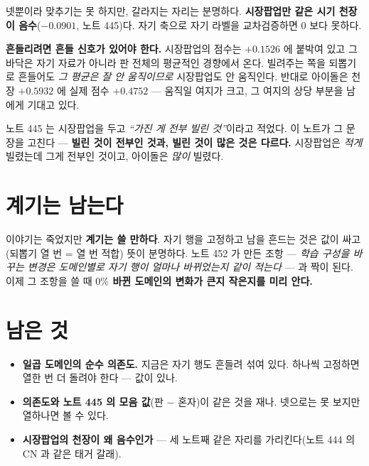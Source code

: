 \documentclass[11pt]{article}
\begin{document}
넷뿐이라 맞추기는 못 하지만, 갈라지는 자리는 분명하다. \textbf{시장팝업만
같은 시기 천장이 음수}($-0.0901$, 노트 445)다. 자기 축으로 자기 라벨을
교차검증하면 $0$ 보다 못하다.

\textbf{흔들리려면 흔들 신호가 있어야 한다.} 시장팝업의 점수는
$+0.1526$ 에 붙박여 있고 그 바닥은 자기 자료가 아니라 판 전체의 평균적인
경향에서 온다. 빌려주는 쪽을 되뽑기로 흔들어도 \emph{그 평균은 잘 안
움직이므로} 시장팝업도 안 움직인다. 반대로 아이돌은 천장 $+0.5932$ 에
실제 점수 $+0.4752$ --- 움직일 여지가 크고, 그 여지의 상당 부분을 남에게
기대고 있다.

노트 445 는 시장팝업을 두고 \emph{``가진 게 전부 빌린 것''}이라고 적었다.
이 노트가 그 문장을 고친다 --- \textbf{빌린 것이 전부인 것과, 빌린 것이
많은 것은 다르다.} 시장팝업은 \emph{적게} 빌렸는데 그게 전부인 것이고,
아이돌은 \emph{많이} 빌렸다.

\section{계기는 남는다}

이야기는 죽었지만 \textbf{계기는 쓸 만하다}. 자기 행을 고정하고 남을
흔드는 것은 값이 싸고(되뽑기 열 번 = 열 번 적합) 뜻이 분명하다. 노트 452
가 만든 조항 --- \emph{학습 구성을 바꾸는 변경은 도메인별로 자기 행이
얼마나 바뀌었는지 같이 적는다} --- 과 짝이 된다. 이제 그 조항을 쓸 때
\textbf{$0\%$ 바뀐 도메인의 변화가 큰지 작은지를 미리 안다.}

\section*{남은 것}

\begin{itemize}
\item \textbf{일곱 도메인의 순수 의존도.} 지금은 자기 행도 흔들려 섞여
있다. 하나씩 고정하면 열한 번 더 돌려야 한다 --- 값이 있나.
\item \textbf{의존도와 노트 445 의 모음 값}(판 $-$ 혼자)이 같은 것을
재나. 넷으로는 못 보지만 열하나면 볼 수 있다.
\item \textbf{시장팝업의 천장이 왜 음수인가} --- 세 노트째 같은 자리를
가리킨다(노트 444 의 CN 과 같은 태거 갈래).
\end{itemize}
\end{document}
